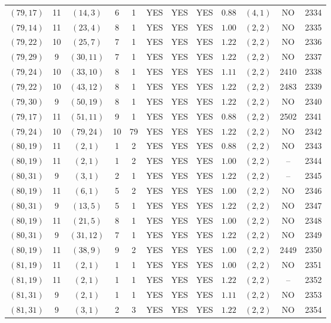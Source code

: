 \begin{longtable}{|c|c|c|c|c|c|c|c|c|c|c|c|}
$(79,17)$ & 11 & $(14,3)$ & 6 & 1 & YES & YES & YES & $0.88$ & $(4,1)$ & NO & 2334\\
$(79,14)$ & 11 & $(23,4)$ & 8 & 1 & YES & YES & YES & $1.00$ & $(2,2)$ & NO & 2335\\
$(79,22)$ & 10 & $(25,7)$ & 7 & 1 & YES & YES & YES & $1.22$ & $(2,2)$ & NO & 2336\\
$(79,29)$ & 9 & $(30,11)$ & 7 & 1 & YES & YES & YES & $1.22$ & $(2,2)$ & NO & 2337\\
$(79,24)$ & 10 & $(33,10)$ & 8 & 1 & YES & YES & YES & $1.11$ & $(2,2)$ & 2410 & 2338\\
$(79,22)$ & 10 & $(43,12)$ & 8 & 1 & YES & YES & YES & $1.22$ & $(2,2)$ & 2483 & 2339\\
$(79,30)$ & 9 & $(50,19)$ & 8 & 1 & YES & YES & YES & $1.22$ & $(2,2)$ & NO & 2340\\
$(79,17)$ & 11 & $(51,11)$ & 9 & 1 & YES & YES & YES & $0.88$ & $(2,2)$ & 2502 & 2341\\
$(79,24)$ & 10 & $(79,24)$ & 10 & 79 & YES & YES & YES & $1.22$ & $(2,2)$ & NO & 2342\\
$(80,19)$ & 11 & $(2,1)$ & 1 & 2 & YES & YES & YES & $0.88$ & $(2,2)$ & NO & 2343\\
$(80,19)$ & 11 & $(2,1)$ & 1 & 2 & YES & YES & YES & $1.00$ & $(2,2)$ & -- & 2344\\
$(80,31)$ & 9 & $(3,1)$ & 2 & 1 & YES & YES & YES & $1.22$ & $(2,2)$ & -- & 2345\\
$(80,19)$ & 11 & $(6,1)$ & 5 & 2 & YES & YES & YES & $1.00$ & $(2,2)$ & NO & 2346\\
$(80,31)$ & 9 & $(13,5)$ & 5 & 1 & YES & YES & YES & $1.22$ & $(2,2)$ & NO & 2347\\
$(80,19)$ & 11 & $(21,5)$ & 8 & 1 & YES & YES & YES & $1.00$ & $(2,2)$ & NO & 2348\\
$(80,31)$ & 9 & $(31,12)$ & 7 & 1 & YES & YES & YES & $1.22$ & $(2,2)$ & NO & 2349\\
$(80,19)$ & 11 & $(38,9)$ & 9 & 2 & YES & YES & YES & $1.00$ & $(2,2)$ & 2449 & 2350\\
$(81,19)$ & 11 & $(2,1)$ & 1 & 1 & YES & YES & YES & $1.00$ & $(2,2)$ & NO & 2351\\
$(81,19)$ & 11 & $(2,1)$ & 1 & 1 & YES & YES & YES & $1.22$ & $(2,2)$ & -- & 2352\\
$(81,31)$ & 9 & $(2,1)$ & 1 & 1 & YES & YES & YES & $1.11$ & $(2,2)$ & NO & 2353\\
$(81,31)$ & 9 & $(3,1)$ & 2 & 3 & YES & YES & YES & $1.22$ & $(2,2)$ & NO & 2354\\

\end{longtable}
